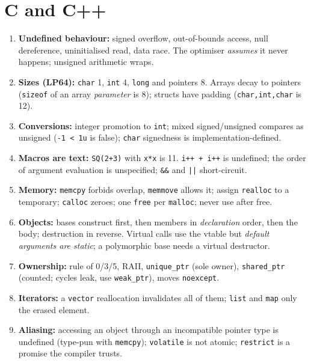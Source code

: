 \documentclass[10pt,a4paper,openany,oneside]{report}
\begin{document}
\section*{C and C++}
\begin{enumerate}[nosep,leftmargin=2.2em,start=1,label=\textbf{\arabic*.}]
\item \textbf{Undefined behaviour:} signed overflow, out-of-bounds access, null dereference, uninitialised read, data race. The optimiser \emph{assumes} it never happens; unsigned arithmetic wraps.
\item \textbf{Sizes (LP64):} \texttt{char} 1, \texttt{int} 4, \texttt{long} and pointers 8. Arrays decay to pointers (\texttt{sizeof} of an array \emph{parameter} is 8); structs have padding (\texttt{char,int,char} is 12).
\item \textbf{Conversions:} integer promotion to \texttt{int}; mixed signed/unsigned compares as unsigned (\texttt{-1 < 1u} is false); \texttt{char} signedness is implementation-defined.
\item \textbf{Macros are text:} \texttt{SQ(2+3)} with \texttt{x*x} is 11. \texttt{i++ + i++} is undefined; the order of argument evaluation is unspecified; \texttt{\&\&} and \texttt{||} short-circuit.
\item \textbf{Memory:} \texttt{memcpy} forbids overlap, \texttt{memmove} allows it; assign \texttt{realloc} to a temporary; \texttt{calloc} zeroes; one \texttt{free} per \texttt{malloc}; never use after free.
\item \textbf{Objects:} bases construct first, then members in \emph{declaration} order, then the body; destruction in reverse. Virtual calls use the vtable but \emph{default arguments are static}; a polymorphic base needs a virtual destructor.
\item \textbf{Ownership:} rule of 0/3/5, RAII, \texttt{unique\_ptr} (sole owner), \texttt{shared\_ptr} (counted; cycles leak, use \texttt{weak\_ptr}), moves \texttt{noexcept}.
\item \textbf{Iterators:} a \texttt{vector} reallocation invalidates all of them; \texttt{list} and \texttt{map} only the erased element.
\item \textbf{Aliasing:} accessing an object through an incompatible pointer type is undefined (type-pun with \texttt{memcpy}); \texttt{volatile} is not atomic; \texttt{restrict} is a promise the compiler trusts.
\end{enumerate}
\end{document}
